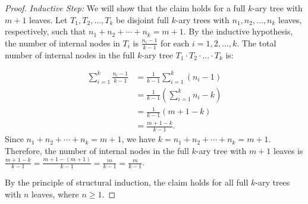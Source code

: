 \documentclass[a4paper, addpoints]{exam}
\theoremstyle{definition}
\theoremstyle{claim}
\begin{document}
\begin{questions}
\begin{solution}
\begin{proof}
      \textit{Inductive Step:} We will show that the claim holds for a full $k$-ary tree with $m+1$ leaves. Let $T_1,T_2,\ldots,T_k$ be disjoint full $k$-ary trees with $n_1,n_2,\ldots,n_k$ leaves, respectively, such that $n_1+n_2+\cdots+n_k=m+1$.
      By the inductive hypothesis, the number of internal nodes in $T_i$ is $\frac{n_i-1}{k-1}$ for each $i=1,2,\ldots,k$. The total number of internal nodes in the full $k$-ary tree $T_1\cdot T_2\cdot\ldots\cdot T_k$ is:

      \begin{align*}
        \sum_{i=1}^{k}\frac{n_i-1}{k-1}&=\frac{1}{k-1}\sum_{i=1}^{k}(n_i-1)\\
        &=\frac{1}{k-1}\left(\sum_{i=1}^{k}n_i-k\right)\\
        &=\frac{1}{k-1}(m+1-k)\\
        &=\frac{m+1-k}{k-1}.
      \end{align*}
      Since $n_1+n_2+\cdots+n_k=m+1$, we have $k=n_1+n_2+\cdots+n_k=m+1$. Therefore, the number of internal nodes in the full $k$-ary tree with $m+1$ leaves is $\frac{m+1-k}{k-1}=\frac{m+1-(m+1)}{k-1}=\frac{m}{k-1}=\frac{m}{k-1}$.

      By the principle of structural induction, the claim holds for all full $k$-ary trees with $n$ leaves, where $n\geq 1$.
    \end{proof}
  \end{solution}
\end{questions}
\end{document}
